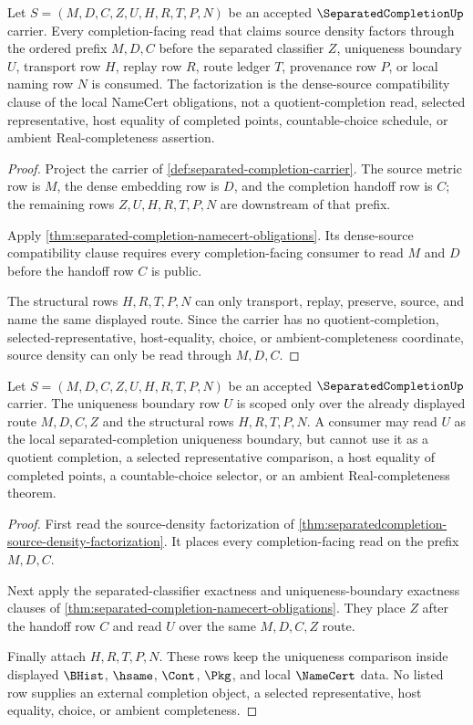 \begin{theorem}\label{thm:separatedcompletion-source-density-factorization}
Let $S=(M,D,C,Z,U,H,R,T,P,N)$ be an accepted $\SeparatedCompletionUp$ carrier. Every completion-facing read that claims source density factors through the ordered prefix $M,D,C$ before the separated classifier $Z$, uniqueness boundary $U$, transport row $H$, replay row $R$, route ledger $T$, provenance row $P$, or local naming row $N$ is consumed. The factorization is the dense-source compatibility clause of the local NameCert obligations, not a quotient-completion read, selected representative, host equality of completed points, countable-choice schedule, or ambient Real-completeness assertion.
\end{theorem}
\begin{proof}
Project the carrier of \autoref{def:separated-completion-carrier}. The source metric row is $M$, the dense embedding row is $D$, and the completion handoff row is $C$; the remaining rows $Z,U,H,R,T,P,N$ are downstream of that prefix.

Apply \autoref{thm:separated-completion-namecert-obligations}. Its dense-source compatibility clause requires every completion-facing consumer to read $M$ and $D$ before the handoff row $C$ is public.

The structural rows $H,R,T,P,N$ can only transport, replay, preserve, source, and name the same displayed route. Since the carrier has no quotient-completion, selected-representative, host-equality, choice, or ambient-completeness coordinate, source density can only be read through $M,D,C$.
\end{proof}

\begin{theorem}\label{thm:separatedcompletion-uniqueness-boundary-scope}
Let $S=(M,D,C,Z,U,H,R,T,P,N)$ be an accepted $\SeparatedCompletionUp$ carrier. The uniqueness boundary row $U$ is scoped only over the already displayed route $M,D,C,Z$ and the structural rows $H,R,T,P,N$. A consumer may read $U$ as the local separated-completion uniqueness boundary, but cannot use it as a quotient completion, a selected representative comparison, a host equality of completed points, a countable-choice selector, or an ambient Real-completeness theorem.
\end{theorem}
\begin{proof}
First read the source-density factorization of \autoref{thm:separatedcompletion-source-density-factorization}. It places every completion-facing read on the prefix $M,D,C$.

Next apply the separated-classifier exactness and uniqueness-boundary exactness clauses of \autoref{thm:separated-completion-namecert-obligations}. They place $Z$ after the handoff row $C$ and read $U$ over the same $M,D,C,Z$ route.

Finally attach $H,R,T,P,N$. These rows keep the uniqueness comparison inside displayed $\BHist$, $\hsame$, $\Cont$, $\Pkg$, and local $\NameCert$ data. No listed row supplies an external completion object, a selected representative, host equality, choice, or ambient completeness.
\end{proof}

